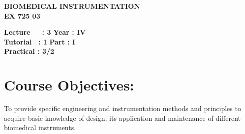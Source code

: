 \begin{center}
    \textbf{\huge{\uppercase{Biomedical Instrumentation}}}
    \\
    \vspace{.5cm}
    \textbf{\large{EX 725 03}}
\end{center}

\noindent\textbf{Lecture\ \ \ : 3} \hfill \textbf{Year : IV} \\
\textbf{Tutorial \ : 1} \hfill \textbf{Part : I } \\
\textbf{Practical : 3/2}  \\

\par
\noindent 
\section*{Course Objectives:}
To provide specific engineering and instrumentation methods and principles to acquire basic knowledge of design, its application and maintenance of different biomedical instruments.

